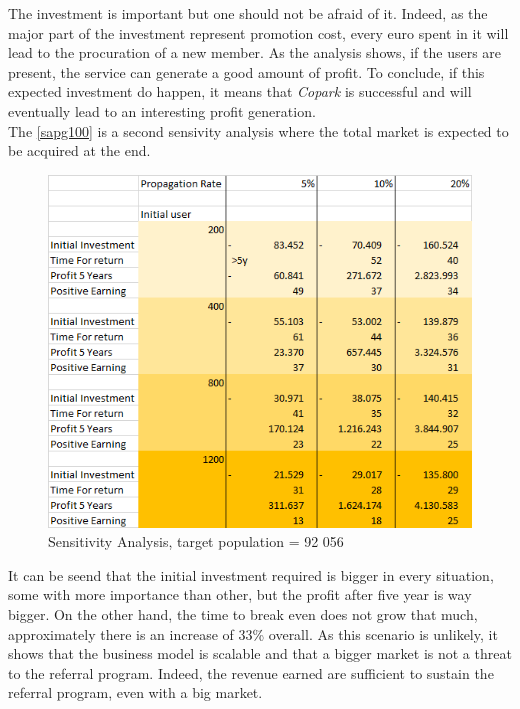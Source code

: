 \documentclass[12pt,a4paper,oneside]{book}
\newcommand{\bp}{\textit{Copark }}
\begin{document}
The investment is important but one should not be afraid of it. Indeed, as the major part of the investment represent promotion cost, every euro spent in it will lead to the procuration of a new member. As the analysis shows, if the users are present, the service can generate a good amount of profit. To conclude, if this expected investment do happen, it means that \bp is successful and will eventually lead to an interesting profit generation.\\

The \autoref{sapg100} is a second sensivity analysis where the total market is expected to be acquired at the end.\\

\begin{figure}[h]
\centering
\caption{Sensitivity Analysis, target population = 92 056}
\label{sapg100}
\includegraphics[keepaspectratio=true,width=\textwidth-2cm]{../images/sensitivity100.png}
\end{figure}

It can be seend that the initial investment required is bigger in every situation, some with more importance than other, but the profit after five year is way bigger. On the other hand, the time to break even does not grow that much, approximately there is an increase of 33\% overall. As this scenario is unlikely, it shows that the business model is scalable and that a bigger market is not a threat to the referral program. Indeed, the revenue earned are sufficient to sustain the referral program, even with a big market.
\end{document}
